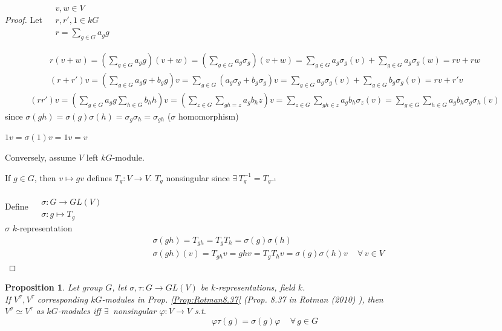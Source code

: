\documentclass[10pt]{amsart}
\newtheorem{proposition}{Proposition}
\begin{document}
\begin{multicols*}{2}
\begin{proof}
	Let $\begin{aligned} & \quad \\ 
	& v,w \in V \\
	& r,r',1 \in kG \\
	& r = \sum_{g\in G} a_g g \end{aligned}$
	
	\[
	\begin{gathered}
	r(v+w) = \left( \sum_{g\in G} a_g g \right)(v+w) = \left( \sum_{g \in G} a_g \sigma_g \right)(v+w) = \sum_{g\in G} a_g \sigma_g(v) + \sum_{g\in G} a_g \sigma_g(w) = rv + rw \\ 
	(r+r')v = \left( \sum_{g\in G} a_g g + b_g g \right) v =\sum_{g\in G} (a_g \sigma_g + b_g \sigma_g ) v = \sum_{g \in G}a_g \sigma_g(v) + \sum_{g\in G}b_g \sigma_g(v) = rv + r'v 
	\end{gathered}
	\]
	\[
	\begin{gathered}
	(rr')v = \left( \sum_{g\in G} a_g g \sum_{h \in G} b_h h \right)v = \left( \sum_{z\in G} \sum_{gh = z} a_g b_h z \right) v = \sum_{z\in G} \sum_{gh \in z} a_g b_h \sigma_z(v) = \sum_{g\in G} \sum_{h \in G} a_g b_h \sigma_g \sigma_h (v)
	\end{gathered}
	\]
	since $\sigma(gh) = \sigma(g) \sigma(h) = \sigma_g \sigma_h = \sigma_{gh}$ ($\sigma$ homomorphism)
	
	$1v = \sigma(1) v = 1v = v$
	
	Conversely, assume $V$ left $kG$-module.
	
	If $g \in G$, then $v\mapsto gv$ defines $T_g:V \to V$.  $T_g$ nonsingular since $\exists \, T_g^{-1} = T_{g^{-1}}$
	
	Define $\begin{aligned} & \quad \\
	& \sigma : G \to GL(V) \\
	& \sigma: g \mapsto T_g \end{aligned}$ \quad \\
	
	$\sigma$ $k$-representation
	\[
	\begin{aligned}
	& \sigma(gh) = T_{gh} = T_g T_h = \sigma(g)\sigma(h) \\
	& \sigma(gh)(v) = T_{gh}v = ghv = T_gT_h v = \sigma(g)\sigma(h)v \quad \, \forall \, v \in V
	\end{aligned}
	\]
	
\end{proof}

\begin{proposition}
	Let group $G$, let $\sigma, \tau: G \to GL(V)$ be $k$-representations, field $k$.  \\
	If $V^{\sigma}, V^{\tau}$ corresponding $kG$-modules in Prop. \ref{Prop:Rotman8.37} (Prop. 8.37 in Rotman (2010) \cite{JRotman2010}), then \\
	$V^{\sigma} \simeq V^{\tau}$ as $kG$-modules iff $\exists \, $ nonsingular $\varphi :V \to V$ s.t. 
	\[
	\varphi \tau(g) = \sigma(g) \varphi \quad \, \forall \, g \in G
	\]
	

\end{proposition}
\end{multicols*}
\end{document}
